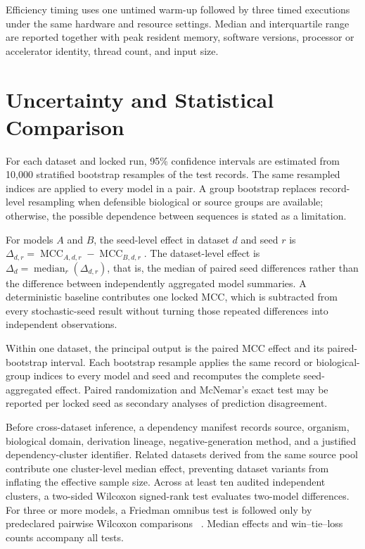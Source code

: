 Efficiency timing uses one untimed warm-up followed by three timed executions
under the same hardware and resource settings. Median and interquartile range
are reported together with peak resident memory, software versions, processor
or accelerator identity, thread count, and input size.

\section{Uncertainty and Statistical Comparison}\label{sec:protocol-statistics}

For each dataset and locked run, 95\% confidence intervals are estimated from
10,000 stratified bootstrap resamples of the test records. The same resampled
indices are applied to every model in a pair. A group bootstrap replaces
record-level resampling when defensible biological or source groups are
available; otherwise, the possible dependence between sequences is stated as a
limitation.

For models $A$ and $B$, the seed-level effect in dataset $d$ and seed $r$ is
$\Delta_{d,r}=\operatorname{MCC}_{A,d,r}-\operatorname{MCC}_{B,d,r}$. The dataset-level
effect is $\Delta_d=\operatorname{median}_r(\Delta_{d,r})$, that is, the median
of paired seed differences rather than the difference between independently
aggregated model summaries. A deterministic baseline contributes one locked
MCC, which is subtracted from every stochastic-seed result without turning
those repeated differences into independent observations.

Within one dataset, the principal output is the paired MCC effect and its
paired-bootstrap interval. Each bootstrap resample applies the same record or
biological-group indices to every model and seed and recomputes the complete
seed-aggregated effect. Paired randomization and McNemar's exact test may be
reported per locked seed as secondary analyses of prediction disagreement.

Before cross-dataset inference, a dependency manifest records source,
organism, biological domain, derivation lineage, negative-generation method,
and a justified dependency-cluster identifier. Related datasets derived from
the same source pool contribute one cluster-level median effect, preventing
dataset variants from inflating the effective sample size. Across at least ten
audited independent clusters, a two-sided Wilcoxon signed-rank test evaluates
two-model differences. For three or more models, a Friedman omnibus test is
followed only by predeclared pairwise Wilcoxon comparisons
~\cite{demsar2006statistical}. Median effects and win--tie--loss counts accompany
all tests.

